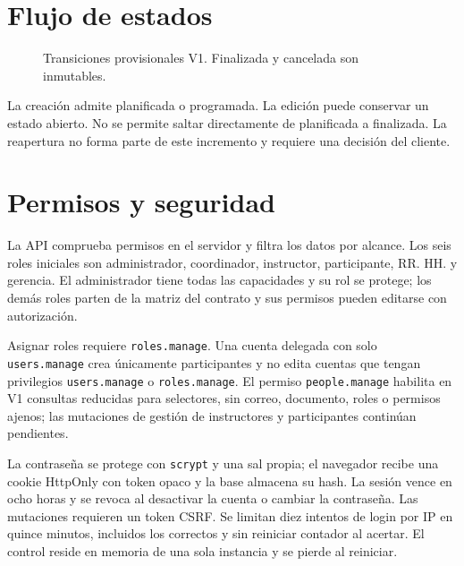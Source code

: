 \section{Flujo de estados}
\begin{figure}[htbp]
\centering
{}
\caption{Transiciones provisionales V1. Finalizada y cancelada son inmutables.}
\end{figure}

La creación admite planificada o programada. La edición puede conservar un estado abierto. No se permite saltar directamente de planificada a finalizada. La reapertura no forma parte de este incremento y requiere una decisión del cliente.

\section{Permisos y seguridad}
La API comprueba permisos en el servidor y filtra los datos por alcance. Los seis roles iniciales son administrador, coordinador, instructor, participante, RR. HH. y gerencia. El administrador tiene todas las capacidades y su rol se protege; los demás roles parten de la matriz del contrato y sus permisos pueden editarse con autorización.

Asignar roles requiere \texttt{roles.manage}. Una cuenta delegada con solo \texttt{users.manage} crea únicamente participantes y no edita cuentas que tengan privilegios \texttt{users.manage} o \texttt{roles.manage}. El permiso \texttt{people.manage} habilita en V1 consultas reducidas para selectores, sin correo, documento, roles o permisos ajenos; las mutaciones de gestión de instructores y participantes continúan pendientes.

La contraseña se protege con \texttt{scrypt} y una sal propia; el navegador recibe una cookie HttpOnly con token opaco y la base almacena su hash. La sesión vence en ocho horas y se revoca al desactivar la cuenta o cambiar la contraseña. Las mutaciones requieren un token CSRF. Se limitan diez intentos de login por IP en quince minutos, incluidos los correctos y sin reiniciar contador al acertar. El control reside en memoria de una sola instancia y se pierde al reiniciar.


